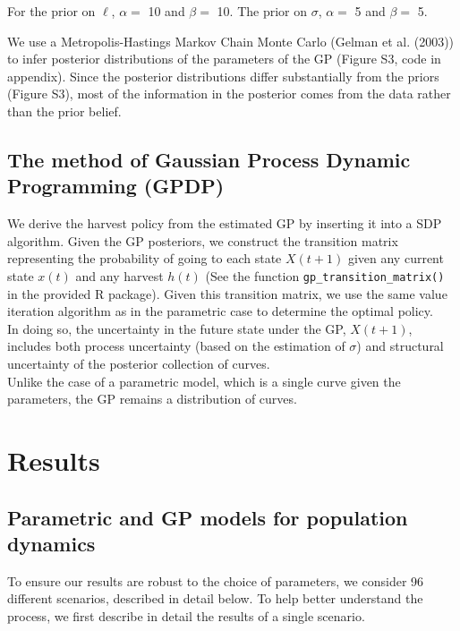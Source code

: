 \documentclass[author-year, 12pt,review]{components/elsarticle} %
\begin{document}
For the prior on $\ell$, $\alpha = $ 10 and $\beta = $ 10. The prior on
$\sigma$, $\alpha = $ 5 and $\beta = $ 5.

We use a Metropolis-Hastings Markov Chain Monte Carlo (Gelman et al.
(2003)) to infer posterior distributions of the parameters of the GP
(Figure S3, code in appendix). Since the posterior distributions differ
substantially from the priors (Figure S3), most of the information in
the posterior comes from the data rather than the prior belief.

\subsection{The method of Gaussian Process Dynamic Programming
(GPDP)}\label{the-method-of-gaussian-process-dynamic-programming-gpdp}

We derive the harvest policy from the estimated GP by inserting it into
a SDP algorithm. Given the GP posteriors, we construct the transition
matrix representing the probability of going to each state $X(t+1)$
given any current state $x(t)$ and any harvest $h(t)$ (See the function
\texttt{gp\_transition\_matrix()} in the provided R package). Given this
transition matrix, we use the same value iteration algorithm as in the
parametric case to determine the optimal policy.\\In doing so, the
uncertainty in the future state under the GP, $X(t+1)$, includes both
process uncertainty (based on the estimation of $\sigma$) and structural
uncertainty of the posterior collection of curves.\\Unlike the case of a
parametric model, which is a single curve given the parameters, the GP
remains a distribution of curves.

\section{Results}\label{results}

\subsection{Parametric and GP models for population
dynamics}\label{parametric-and-gp-models-for-population-dynamics}

To ensure our results are robust to the choice of parameters, we
consider 96 different scenarios, described in detail below. To help
better understand the process, we first describe in detail the results
of a single scenario.
\end{document}
